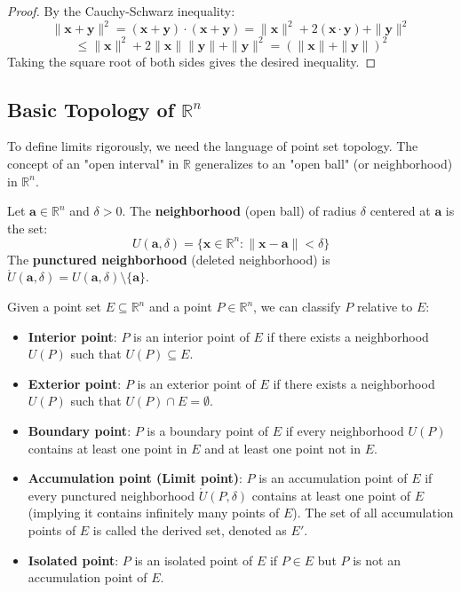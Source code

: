 \begin{proof}
By the Cauchy-Schwarz inequality:
\[ \|\mathbf{x} + \mathbf{y}\|^2 = (\mathbf{x} + \mathbf{y}) \cdot (\mathbf{x} + \mathbf{y}) = \|\mathbf{x}\|^2 + 2(\mathbf{x} \cdot \mathbf{y}) + \|\mathbf{y}\|^2 \]
\[ \le \|\mathbf{x}\|^2 + 2\|\mathbf{x}\| \|\mathbf{y}\| + \|\mathbf{y}\|^2 = (\|\mathbf{x}\| + \|\mathbf{y}\|)^2 \]
Taking the square root of both sides gives the desired inequality.
\end{proof}

\subsection{Basic Topology of \texorpdfstring{$\mathbb{R}^n$}{R n}}

To define limits rigorously, we need the language of point set topology. The concept of an "open interval" in $\mathbb{R}$ generalizes to an "open ball" (or neighborhood) in $\mathbb{R}^n$.

\begin{definition}
Let $\mathbf{a} \in \mathbb{R}^n$ and $\delta > 0$. The \textbf{neighborhood} (open ball) of radius $\delta$ centered at $\mathbf{a}$ is the set:
\[ U(\mathbf{a}, \delta) = \{ \mathbf{x} \in \mathbb{R}^n : \|\mathbf{x} - \mathbf{a}\| < \delta \} \]
The \textbf{punctured neighborhood} (deleted neighborhood) is $\mathring{U}(\mathbf{a}, \delta) = U(\mathbf{a}, \delta) \setminus \{\mathbf{a}\}$.
\end{definition}

Given a point set $E \subseteq \mathbb{R}^n$ and a point $P \in \mathbb{R}^n$, we can classify $P$ relative to $E$:
\begin{itemize}
    \item \textbf{Interior point}: $P$ is an interior point of $E$ if there exists a neighborhood $U(P)$ such that $U(P) \subseteq E$.
    \item \textbf{Exterior point}: $P$ is an exterior point of $E$ if there exists a neighborhood $U(P)$ such that $U(P) \cap E = \emptyset$.
    \item \textbf{Boundary point}: $P$ is a boundary point of $E$ if every neighborhood $U(P)$ contains at least one point in $E$ and at least one point not in $E$.
    \item \textbf{Accumulation point (Limit point)}: $P$ is an accumulation point of $E$ if every punctured neighborhood $\mathring{U}(P, \delta)$ contains at least one point of $E$ (implying it contains infinitely many points of $E$). The set of all accumulation points of $E$ is called the derived set, denoted as $E'$.
    \item \textbf{Isolated point}: $P$ is an isolated point of $E$ if $P \in E$ but $P$ is not an accumulation point of $E$.
\end{itemize}

